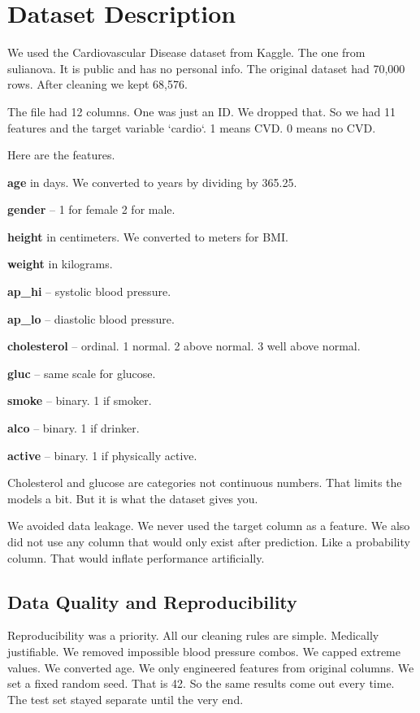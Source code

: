 \documentclass[12pt, a4paper, oneside]{book}
\begin{document}
\section{Dataset Description}
We used the Cardiovascular Disease dataset from Kaggle. The one from sulianova. It is public and has no personal info. The original dataset had 70,000 rows. After cleaning we kept 68,576.

The file had 12 columns. One was just an ID. We dropped that. So we had 11 features and the target variable `cardio`. 1 means CVD. 0 means no CVD.

Here are the features.

\textbf{age} in days. We converted to years by dividing by 365.25.

\textbf{gender} – 1 for female 2 for male.

\textbf{height} in centimeters. We converted to meters for BMI.

\textbf{weight} in kilograms.

\textbf{ap\_hi} – systolic blood pressure.

\textbf{ap\_lo} – diastolic blood pressure.

\textbf{cholesterol} – ordinal. 1 normal. 2 above normal. 3 well above normal.

\textbf{gluc} – same scale for glucose.

\textbf{smoke} – binary. 1 if smoker.

\textbf{alco} – binary. 1 if drinker.

\textbf{active} – binary. 1 if physically active.

Cholesterol and glucose are categories not continuous numbers. That limits the models a bit. But it is what the dataset gives you.

We avoided data leakage. We never used the target column as a feature. We also did not use any column that would only exist after prediction. Like a probability column. That would inflate performance artificially.

\subsection{Data Quality and Reproducibility}
Reproducibility was a priority. All our cleaning rules are simple. Medically justifiable. We removed impossible blood pressure combos. We capped extreme values. We converted age. We only engineered features from original columns. We set a fixed random seed. That is 42. So the same results come out every time. The test set stayed separate until the very end.
\end{document}

